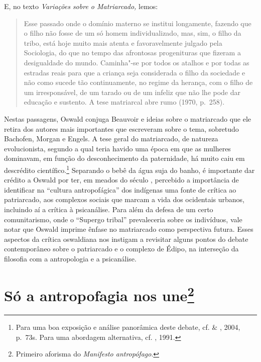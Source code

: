 E, no texto \emph{Variações sobre o Matriarcado,} lemos:

\begin{quote}
Esse passado onde o domínio materno se institui longamente, fazendo que
o filho não fosse de um só homem individualizado, mas, sim, o filho da
tribo, está hoje muito mais atenta e favoravelmente julgado pela
Sociologia, do que no tempo das afrontosas progenituras que fizeram a
desigualdade do mundo. Caminha"-se por todos os atalhos e por todas as
estradas reais para que a criança seja considerada o filho da sociedade
e não como sucede tão continuamente, no regime da herança, com o filho
de um irresponsável, de um tarado ou de um infeliz que não lhe pode dar
educação e sustento. A tese matriarcal abre rumo (1970, p.~258).
\end{quote}

Nestas passagens, Oswald conjuga Beauvoir e ideias sobre o matriarcado
que ele retira dos autores mais importantes que escreveram sobre o tema,
sobretudo Bachofen, Morgan e Engels. A tese geral do matriarcado, de
natureza evolucionista, segundo a qual teria havido uma época em que as
mulheres dominavam, em função do desconhecimento da paternidade, há
muito caiu em descrédito científico.\footnote{Para uma boa exposição e
  análise panorâmica deste debate, cf.  \& , 2004, p.~73s. Para
  uma abordagem alternativa, cf. , 1991.} Separando o bebê da água
suja do banho, é importante dar crédito a Oswald por ter, em meados do
século , percebido a importância de identificar na ``cultura
antropofágica'' dos indígenas uma fonte de crítica ao patriarcado, aos
complexos sociais que marcam a vida dos ocidentais urbanos, incluindo aí
a crítica à psicanálise. Para além da defesa de um certo comunitarismo,
onde o ``Supergo tribal'' prevaleceria sobre os indivíduos, vale notar
que Oswald imprime ênfase no matriarcado como perspectiva futura. Esses
aspectos da crítica oswaldiana nos instigam a revisitar alguns pontos do
debate contemporâneo sobre o patriarcado e o complexo de Édipo, na
interseção da filosofia com a antropologia e a psicanálise.

\section{Só a antropofagia nos une\protect\footnote{\uppercase{P}rimeiro aforisma do
  \emph{\uppercase{M}anifesto antropófago}.}}

